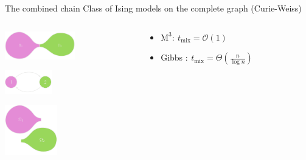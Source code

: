 \documentclass[mathserif]{beamer}
\begin{document}
\begin{frame}{The combined chain}
\vspace{0.5em}
Class of Ising models on the complete graph (Curie-Weiss)

\vspace{1em}
\begin{columns}[t]
\begin{column}{0.3\textwidth}
\centering

\vspace{0.1em}
\includegraphics[width=1.2in]{figures/bottleneck1.pdf}

\vspace{2.5em}
\includegraphics[width=0.8in]{figures/projection.pdf}

\vspace{2em}
\hspace{0.3em}\includegraphics[width=0.9in]{figures/restriction.pdf}
\end{column}

\begin{column}{0.66\textwidth}
\vspace{-1em}

\vspace{1.4em}
\begin{itemize}
\item<4-> $\mathrm{M}^3:\ t_{\mathrm{mix}} = \mathcal{O}(1)$ 
\end{itemize}

\vspace{3.2em}
\begin{itemize}
\item<3-> Gibbs $:\ t_{\mathrm{mix}} = \Theta\left( \displaystyle\frac{n}{\log n} \right)$ 
\end{itemize}
\end{column}
\end{columns}

\end{frame}
\end{document}
